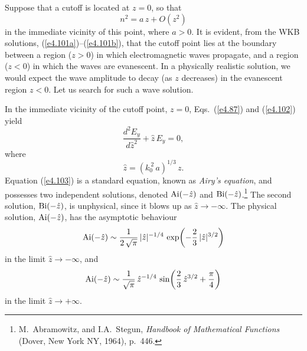 Suppose that a cutoff is located at $z=0$, so that
\begin{equation}\label{e4.102}
n^2 = a\,z+ O(z^2)
\end{equation}
in the immediate vicinity of this point, where $a>0$. It is evident, from the
WKB solutions, (\ref{e4.101a})--(\ref{e4.101b}),  that
the cutoff point lies at the boundary between a region ($z>0$) in which
electromagnetic 
waves propagate, and a region ($z<0$) in which the  waves are evanescent. 
In  a physically realistic solution, we would expect the wave amplitude to
decay (as $z$ decreases) in the evanescent region $z<0$. Let us search for
such a wave solution. 

In the immediate vicinity of the cutoff point, 
$z=0$, Eqs.~(\ref{e4.87}) and (\ref{e4.102}) yield
\begin{equation}\label{e4.103}
\frac{d^2 E_y}{d\hat{z}^2} + \hat{z}\,E_y = 0,
\end{equation}
where 
\begin{equation}
\hat{z} = (k_0^{~2}\,a)^{1/3}\,z.
\end{equation}
Equation (\ref{e4.103}) is a standard
equation, known as {\em Airy's equation}, and possesses two 
independent solutions, denoted ${\rm Ai}(-\hat{z})$ and ${\rm Bi}(-\hat{z})$.\footnote{M.~Abramowitz, and I.A.~Stegun, {\em Handbook of Mathematical Functions}
(Dover, New York NY, 1964), p.~446.} The second solution, ${\rm Bi}(-\hat{z})$,
is unphysical, since it blows up as $\hat{z}\rightarrow-\infty$. 
The physical solution, ${\rm Ai}(-\hat{z})$, has the asymptotic
behaviour
\begin{equation}
{\rm Ai}(-\hat{z})\sim \frac{1}{2\,\sqrt{\pi}}\, |\hat{z}|^{-1/4}\,\exp\!
\left(-\frac{2}{3}\,|\hat{z}|^{3/2}\right)
\end{equation}
in the limit $\hat{z}\rightarrow-\infty$, and
\begin{equation}
{\rm Ai}(-\hat{z})\sim \frac{1}{\sqrt{\pi}}\, \hat{z}^{-1/4}\,\sin\!
\left(\frac{2}{3}\,\hat{z}^{3/2}+\frac{\pi}{4}\right)
\end{equation}
in the limit $\hat{z}\rightarrow +\infty$. 


